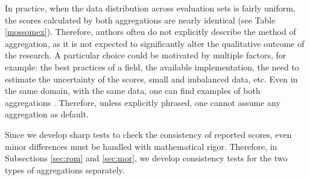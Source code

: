 \documentclass[3p, times]{elsarticle}
\begin{document}
In practice, when the data distribution across evaluation sets is fairly uniform, the scores calculated by both aggregations are nearly identical (see Table \ref{mossomex}). Therefore, authors often do not explicitly describe the method of aggregation, as it is not expected to significantly alter the qualitative outcome of the research. A particular choice could be motivated by multiple factors, for example: the best practices of a field, the available implementation, the need to estimate the uncertainty of the scores, small and imbalanced data, etc. Even in the same domain, with the same data, one can find examples of both aggregations \cite{vessel}. Therefore, unless explicitly phrased, one cannot assume any aggregation as default.

Since we develop sharp tests to check the consistency of reported scores, even minor differences must be handled with mathematical rigor. Therefore, in Subsections \ref{sec:rom} and \ref{sec:mor}, we develop consistency tests for the two types of aggregations separately.
\end{document}
